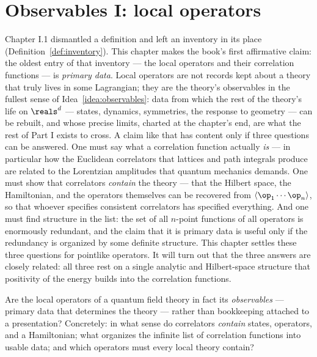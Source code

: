 \section{Observables I: local operators}
\label{ch:local-operators}

Chapter I.1 dismantled a definition and left an inventory in its place
(Definition~\ref{def:inventory}). This chapter makes the book's first
affirmative claim: the oldest entry of that inventory --- the local operators
and their correlation functions --- is \emph{primary data}. Local operators
are not records kept about a theory that truly lives in some Lagrangian; they
are the theory's observables in the fullest sense of
Idea~\ref{idea:observables}: data from which the rest of the theory's life on
$\reals^d$ --- states, dynamics, symmetries, the response to geometry --- can
be rebuilt, and whose precise limits, charted at the chapter's end, are what
the rest of Part I exists to cross. A claim like that has content only if
three questions can be answered. One must say what a correlation function
actually \emph{is} --- in particular how the Euclidean correlators that
lattices and path integrals produce are related to the Lorentzian amplitudes
that quantum mechanics demands. One must show that correlators \emph{contain}
the theory --- that the Hilbert space, the Hamiltonian, and the operators
themselves can be recovered from $\langle \op_1 \cdots \op_n\rangle$, so that
whoever specifies consistent correlators has specified everything. And one
must find structure in the list: the set of all $n$-point functions of all
operators is enormously redundant, and the claim that it is primary data is
useful only if the redundancy is organized by some definite structure. This
chapter settles these three questions for pointlike operators. It will turn
out that the three answers are closely related: all three rest on a single
analytic and Hilbert-space structure that positivity of the energy builds
into the correlation functions.

\begin{qquestion}
Are the local operators of a quantum field theory in fact its
\emph{observables} --- primary data that determines the theory --- rather
than bookkeeping attached to a presentation? Concretely: in what sense do
correlators \emph{contain} states, operators, and a Hamiltonian; what
organizes the infinite list of correlation functions into usable data; and
which operators must every local theory contain?
\end{qquestion}

